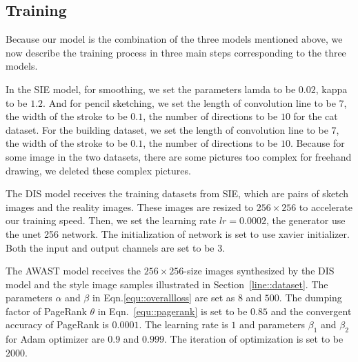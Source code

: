 \documentclass[10pt,twocolumn,letterpaper]{article}
\begin{document}
\subsection{Training}
Because our model is the combination of the three models mentioned above, we now describe the training process in three main steps corresponding to the three models.

In the SIE model, for smoothing, we set the parameters lamda to be $0.02$, kappa to be $1.2$. And for pencil sketching, we set the length of convolution line to be $7$, the width of the stroke to be $0.1$, the number of directions to be $10$ for the cat dataset. For the building dataset, we set the length of convolution line to be $7$, the width of the stroke to be $0.1$, the number of directions to be $10$. Because for some image in the two datasets, there are some pictures too complex for freehand drawing, we deleted these complex pictures.

The DIS model receives the training datasets from SIE, which are pairs of sketch images and the reality images. These images are resized to $256\times 256$ to accelerate our training speed. Then, we set the learning rate $lr = 0.0002$, the generator use the unet 256 network. The initialization of network is set to use xavier initializer. Both the input and output channels are set to be $3$.

The AWAST model receives the $256\times 256$-size images synthesized by the DIS model and the style image samples illustrated in Section~\ref{line::dataset}. The parameters $\alpha$ and $\beta$ in Eqn.\ref{equ::overallloss} are set as $8$ and $500$. The dumping factor of PageRank $\theta$ in Eqn.~\ref{equ::pagerank} is set to be $0.85$ and the convergent accuracy of PageRank is $0.0001$. The learning rate is $1$ and parameters $\beta_1$ and $\beta_2$ for Adam optimizer are $0.9$ and $0.999$. The iteration of optimization is set to be $2000$.
\end{document}
